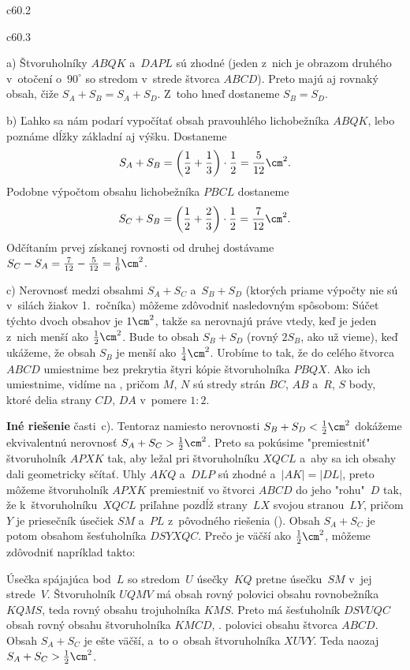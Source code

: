 {%
\epsplace c60.2 \hfil\Obr\par
\epsplace c60.3 \hfil\Obr\par
a) Štvoruholníky $ABQK$ a~$DAPL$ sú zhodné (jeden z~nich je obrazom druhého
v~otočení o~$90^\circ$ so stredom v~strede štvorca $ABCD$).
Preto majú aj rovnaký obsah, čiže $S_A+S_B=S_A+S_D$. Z~toho hneď dostaneme $S_B=S_D$.

\smallskip
b) Ľahko sa nám podarí vypočítať obsah pravouhlého lichobežníka $ABQK$, lebo poznáme dĺžky základní aj výšku.
Dostaneme
$$
S_A+S_B=\left(\frac12+\frac13\right)\cdot\frac12=\frac5{12}\cm^2.
$$
Podobne výpočtom obsahu lichobežníka $PBCL$ dostaneme
$$
S_C+S_B=\left(\frac12+\frac23\right)\cdot\frac12=\frac7{12}\cm^2.
$$
Odčítaním prvej získanej rovnosti od druhej dostávame $S_C-S_A=\frac7{12}-\frac5{12}=\frac16\cm^2$.

\smallskip
c) Nerovnosť medzi obsahmi $S_A+S_C$ a~$S_B+S_D$ (ktorých priame výpočty nie sú v~silách
žiakov 1.~ročníka) môžeme zdôvodniť nasledovným spôsobom: Súčet
týchto dvoch obsahov je $1\cm^2$, takže sa nerovnajú práve vtedy, keď je jeden
z~nich menší ako $\frac12\cm^2$. Bude to obsah $S_B+S_D$ (rovný $2S_B$, ako už vieme),
keď ukážeme, že obsah $S_B$ je menší ako $\frac14\cm^2$. Urobíme to tak, že do
celého štvorca $ABCD$ umiestnime bez prekrytia štyri kópie štvoruholníka $PBQX$.
Ako ich umiestnime, vidíme na \obr, pričom $M$, $N$ sú
stredy strán $BC$, $AB$ a~$R$, $S$ body, ktoré delia strany $CD$,
$DA$ v~pomere $1:2$.

\twocpictures

\medskip\noindent
{\bf Iné riešenie} časti~c).
Tentoraz namiesto nerovnosti $S_B+S_D<\frac12\cm^2$ dokážeme ekvivalentnú
nerovnosť $S_A+S_C>\frac12\cm^2$. Preto sa pokúsime "premiestniť"
štvoruholník $APXK$ tak, aby ležal pri štvoruholníku
$XQCL$ a~aby sa ich obsahy dali geometricky sčítať. Uhly $AKQ$ a~$DLP$
sú zhodné a~$|AK|=|DL|$, preto môžeme štvoruholník $APXK$ premiestniť vo štvorci $ABCD$ do jeho
"rohu"~$D$ tak, že k~štvoruholníku~$XQCL$ priľahne pozdĺž strany~$LX$ svojou
stranou~$LY$, pričom $Y$ je priesečník úsečiek $SM$ a~$PL$ z~pôvodného riešenia (\obr). Obsah
$S_A+S_C$ je potom obsahom šesťuholníka $DSYXQC$. Prečo je väčší ako $\frac12\cm^2$,
môžeme zdôvodniť napríklad takto:

Úsečka spájajúca bod~$L$ so stredom~$U$ úsečky~$KQ$
pretne úsečku~$SM$ v~jej strede~$V$.
Štvoruholník $UQMV$ má obsah rovný polovici obsahu rovnobežníka $KQMS$, teda
rovný obsahu trojuholníka $KMS$. Preto má šesťuholník $DSVUQC$ obsah
rovný obsahu štvoruholníka $KMCD$, \tj. polovici obsahu štvorca $ABCD$.
Obsah $S_A+S_C$ je ešte väčší, a~to o~obsah štvoruholníka $XUVY$.
Teda naozaj $S_A+S_C>\frac12\cm^2$.

}
